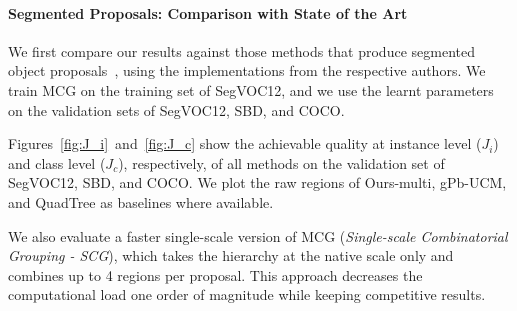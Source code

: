 \documentclass[10pt,journal,cspaper,compsoc]{IEEEtran}
\begin{document}

\paragraph*{\textbf{Segmented Proposals: Comparison with State of the Art}}
We first compare our results against those methods that produce segmented object proposals~\cite{Kraehenbuehl2014,Rantalankila2014,Humayun2014,Uijlings2013,Alexe2012,Kim2012,Carreira2012b,Uijlings2013,Endres2014},
using the implementations from the respective authors.
We train MCG on the training set of SegVOC12, and we use the learnt parameters on the validation sets of SegVOC12, SBD, and COCO.

Figures~\ref{fig:J_i}~and~\ref{fig:J_c} show the achievable quality at instance level ($J_i$) and class level ($J_c$), respectively,
of all methods on the validation set of SegVOC12, SBD, and COCO.
We plot the raw regions of Ours-multi, gPb-UCM, and QuadTree as baselines where available.

We also evaluate a faster single-scale version of MCG (\textit{Single-scale Combinatorial Grouping - SCG}),
which takes the hierarchy at the native scale only and combines up to 4 regions per proposal.   
This approach decreases the computational load one order of magnitude while keeping competitive results.
\end{document}
